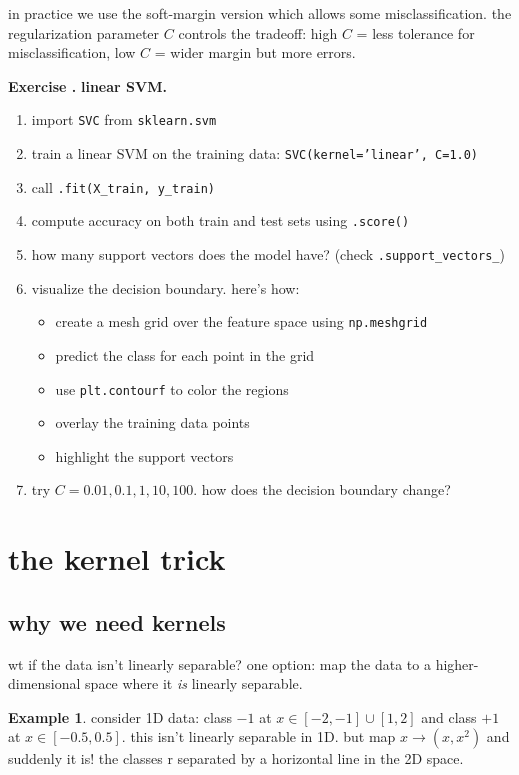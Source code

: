 \documentclass[11pt,a4paper]{article}
\theoremstyle{definition}
\newtheorem{example}{Example}[section]
\theoremstyle{remark}
\newcounter{exercise}[section]
\newenvironment{exercise}{\refstepcounter{exercise}\par\medskip\noindent\textbf{Exercise \theexercise.}\rmfamily}{\medskip}
\begin{document}
in practice we use the soft-margin version which allows some misclassification. the regularization parameter $C$ controls the tradeoff: high $C$ = less tolerance for misclassification, low $C$ = wider margin but more errors.

\begin{exercise}
\textbf{linear SVM.}
\begin{enumerate}[leftmargin=*]
  \item import \texttt{SVC} from \texttt{sklearn.svm}
  \item train a linear SVM on the training data: \texttt{SVC(kernel='linear', C=1.0)}
  \item call \texttt{.fit(X\_train, y\_train)}
  \item compute accuracy on both train and test sets using \texttt{.score()}
  \item how many support vectors does the model have? (check \texttt{.support\_vectors\_})
  \item visualize the decision boundary. here's how:
    \begin{itemize}
      \item create a mesh grid over the feature space using \texttt{np.meshgrid}
      \item predict the class for each point in the grid
      \item use \texttt{plt.contourf} to color the regions
      \item overlay the training data points
      \item highlight the support vectors
    \end{itemize}
  \item try $C = 0.01, 0.1, 1, 10, 100$. how does the decision boundary change?
\end{enumerate}
\end{exercise}

\section{the kernel trick}

\subsection{why we need kernels}

wt if the data isn't linearly separable? one option: map the data to a higher-dimensional space where it \textit{is} linearly separable.

\begin{example}
consider 1D data: class $-1$ at $x \in [-2, -1] \cup [1, 2]$ and class $+1$ at $x \in [-0.5, 0.5]$. this isn't linearly separable in 1D. but map $x \to (x, x^2)$ and suddenly it is! the classes r separated by a horizontal line in the 2D space.
\end{example}
\end{document}
